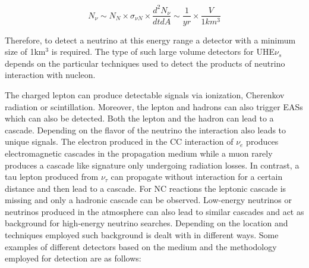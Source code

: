 \begin{equation}
  N_{\nu} \sim N_N \times \sigma_{\nu N} \times \frac{d^2N_{\nu}}{dt dA} \sim \frac{1}{yr} \times \frac{V}{1km^3}
\end{equation}

Therefore, to detect a neutrino at this energy range a detector with a minimum size of 1km$^3$ is required. The type of such large volume detectors for UHE$\nu_s$ depends on the particular techniques used to detect the products of neutrino interaction with nucleon. 


The charged lepton can produce detectable signals via ionization, Cherenkov radiation or scintillation. Moreover, the lepton and hadrons can also trigger EASs which can also be detected. Both the lepton and the hadron can lead to a cascade. Depending on the flavor of the neutrino the interaction also leads to unique signals. The electron produced in the CC interaction of $\nu_e$ produces electromagnetic cascades in the propagation medium while a muon rarely produces a cascade like signature only undergoing radiation losses. In contrast, a tau lepton produced from $\nu_{\tau}$ can propagate without interaction for a certain distance and then lead to a cascade. For NC reactions the leptonic cascade is missing and only a hadronic cascade can be observed. Low-energy neutrinos or neutrinos produced in the atmosphere can also lead to similar cascades and act as background for high-energy neutrino searches. Depending on the location and techniques employed such background is dealt with in different ways. Some examples of different detectors based on the medium and the methodology employed for detection are as follows:

